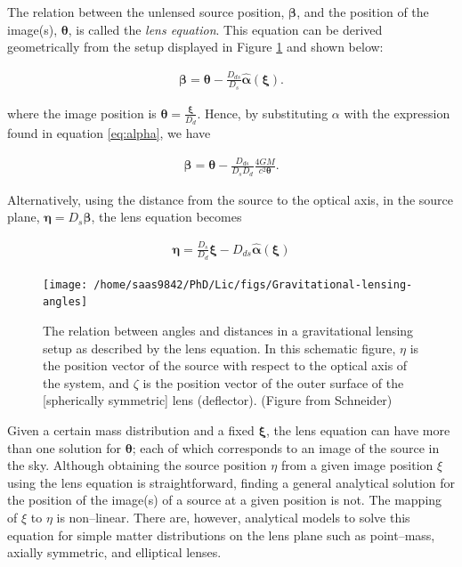 \documentclass[a4wide,12pt]{book}
\begin{document}
{The relation between the unlensed source position, $\boldsymbol \beta$, and the position of the image(s), $\boldsymbol \theta$, is called the \emph{lens equation}. This equation can be derived geometrically from the setup displayed in Figure \ref{fig:config} and shown below:

\begin{eqnarray}
\label{eq:lens_eq_angle}
\boldsymbol \beta = \boldsymbol \theta - \frac{D_{ds}}{D_s} \hat{\boldsymbol \alpha}(\boldsymbol \xi).
\end{eqnarray}

 where the image position is $\boldsymbol \theta = \frac{\boldsymbol \xi}{D_{d}}$. Hence, by substituting $\alpha$ with the expression found in equation \ref{eq:alpha}, we have

\begin{eqnarray}
\label{eq:lens_equation}
\boldsymbol \beta = \boldsymbol \theta - \frac{D_{ds}}{D_s D_d} \frac{4GM}{c^2 \boldsymbol \theta}.
\end{eqnarray}

 Alternatively, using the distance from the source to the optical axis, in the source plane,  $\boldsymbol \eta = D_{s} \boldsymbol \beta$, the lens equation becomes

\begin{eqnarray}
\label{eq:lens_eq_distance}
\boldsymbol \eta = \frac{D_s}{D_d}\boldsymbol \xi - D_{ds}\hat{\boldsymbol \alpha}(\boldsymbol \xi)
\end{eqnarray}

\begin{figure}
\label{fig:config}
\centering
\texttt{[image: /home/saas9842/PhD/Lic/figs/Gravitational-lensing-angles]}
\caption{The relation between angles and distances in a gravitational lensing setup as described by the lens equation. In this schematic figure, $\eta$ is the position vector of the source with respect to the optical axis of the system, and $\zeta$ is the position vector of the outer surface of the [spherically symmetric] lens (deflector). (Figure from Schneider)}
\end{figure}

Given a certain mass distribution and a fixed $\boldsymbol \xi$, the lens equation can have more than one solution for $\boldsymbol \theta$; each of which corresponds to an image of the source in the sky.  Although obtaining the source position $\eta$ from a given image position $\xi$ using the lens equation is straightforward, finding a general analytical solution for the position of the image(s) of a source at a given position is not. The mapping of $\xi$ to $\eta$ is non--linear. There are, however, analytical models to solve this equation for simple matter distributions on the lens plane such as point--mass, axially symmetric, and elliptical lenses.

}
\end{document}
